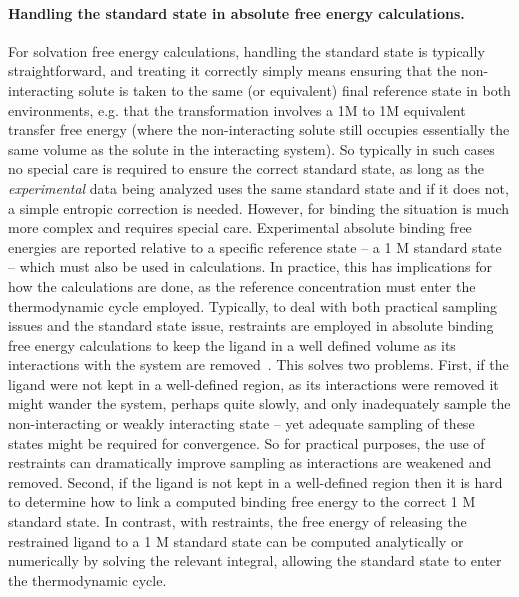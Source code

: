 \documentclass[9pt,bestpractices]{livecoms}
\begin{document}
\paragraph{Handling the standard state in absolute free energy calculations.}
For solvation free energy calculations, handling the standard state is typically straightforward, and treating it correctly simply means ensuring that the non-interacting solute is taken to the same (or equivalent) final reference state in both environments, e.g. that the transformation involves a 1M to 1M equivalent transfer free energy (where the non-interacting solute still occupies essentially the same volume as the solute in the interacting system).
So typically in such cases no special care is required to ensure the correct standard state, as long as the \emph{experimental} data being analyzed uses the same standard state and if it does not, a simple entropic correction is needed.
%
However, for binding the situation is much more complex and requires special care.
Experimental absolute binding free energies are reported relative to a specific reference state -- a 1 M standard state -- which must also be used in calculations.
In practice, this has implications for how the calculations are done, as the reference concentration must enter the thermodynamic cycle employed.
%
Typically, to deal with both practical sampling issues and the standard state issue, restraints are employed in absolute binding free energy calculations to keep the ligand in a well defined volume as its interactions with the system are removed~\cite{gilson1997statisticalthermodynamic}.
This solves two problems.
First, if the ligand were not kept in a well-defined region, as its interactions were removed it might wander the system, perhaps quite slowly, and only inadequately sample the non-interacting or weakly interacting state -- yet adequate sampling of these states might be required for convergence.
So for practical purposes, the use of restraints can dramatically improve sampling as interactions are weakened and removed.
Second, if the ligand is not kept in a well-defined region then it is hard to determine how to link a computed binding free energy to the correct 1 M standard state.
In contrast, with restraints, the free energy of releasing the restrained ligand to a 1 M standard state can be computed analytically or numerically by solving the relevant integral, allowing the standard state to enter the thermodynamic cycle.
%
\end{document}
